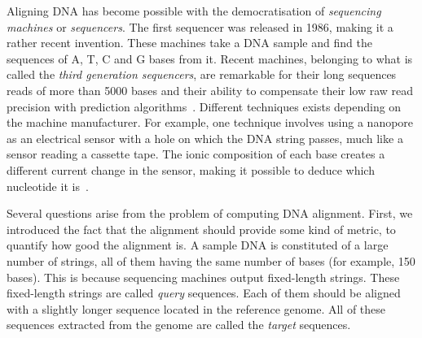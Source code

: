 Aligning DNA has become possible with the democratisation of \emph{sequencing machines} or \emph{sequencers}. The first sequencer was released in 1986, making it a rather recent invention. These machines take a DNA sample and find the sequences of A, T, C and G bases from it. Recent machines, belonging to what is called the \emph{third generation sequencers}, are remarkable for their long sequences reads of more than 5000 bases and their ability to compensate their low raw read precision with prediction algorithms~\cite{Lee048603}. Different techniques exists depending on the machine manufacturer. For example, one technique involves using a nanopore as an electrical sensor with a hole on which the DNA string passes, much like a sensor reading a cassette tape. The ionic composition of each base creates a different current change in the sensor, making it possible to deduce which nucleotide it is~\cite{Oxford:nanopore}.

Several questions arise from the problem of computing DNA alignment. First, we introduced the fact that the alignment should provide some kind of metric, to quantify how good the alignment is. A sample DNA is constituted of a large number of strings, all of them having the same number of bases (for example, 150 bases). This is because sequencing machines output fixed-length strings. These fixed-length strings are called \emph{query} sequences. Each of them should be aligned with a slightly longer sequence located in the reference genome. All of these sequences extracted from the genome are called the \emph{target} sequences.

